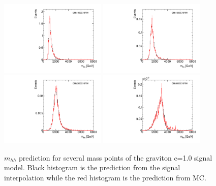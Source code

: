 \begin{figure}[!h]
\begin{center}
\includegraphics*[width=0.45\textwidth]{./figures/boosted/SigInterpolation/InterpolateShape_GC10RW_1000}
\includegraphics*[width=0.45\textwidth]{./figures/boosted/SigInterpolation/InterpolateShape_GC10RW_1500}\\
\includegraphics*[width=0.45\textwidth]{./figures/boosted/SigInterpolation/InterpolateShape_GC10RW_2000}
\includegraphics*[width=0.45\textwidth]{./figures/boosted/SigInterpolation/InterpolateShape_GC10RW_3000}
\caption{$m_{hh}$ prediction for several mass points of the graviton c=1.0 signal model. Black histogram
is the prediction from the signal interpolation while the red histogram is the prediction from MC.}
\label{fig:boosted_siginter_templates_c10}
\end{center}
\end{figure}
\FloatBarrier

